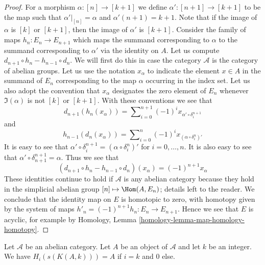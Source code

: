 \begin{proof}
For a morphism $\alpha : [n] \to [k + 1]$
we define $\alpha' : [n + 1] \to [k + 1]$ to be
the map such that $\alpha'|_{[n]} = \alpha$ and
$\alpha'(n + 1) = k + 1$. Note that if the
image of $\alpha$ is $[k]$ or $[k + 1]$, then
the image of $\alpha'$ is $[k + 1]$.
Consider the family of
maps $h_n : E_n \to E_{n + 1}$ which maps
the summand corresponding to $\alpha$ to
the summand corresponding to $\alpha'$ via
the identity on $A$.
Let us compute $d_{n + 1} \circ h_n - h_{n - 1} \circ d_n$.
We will first do this in case the category $\mathcal{A}$ is
the category of abelian groups.
Let us use the notation $x_\alpha$ to indicate
the element $x \in A$ in the summand of $E_n$ corresponding
to the map $\alpha$ occurring in the index set.
Let us also adopt the convention that
$x_\alpha$ designates the zero element of $E_n$
whenever $\Im(\alpha)$ is not $[k]$ or $[k + 1]$.
With these conventions we see that
$$
d_{n + 1}(h_n(x_\alpha)) =
\sum\nolimits_{i = 0}^{n + 1} (-1)^i x_{\alpha' \circ \delta^{n + 1}_i}
$$
and
$$
h_{n - 1}(d_n(x_\alpha)) =
\sum\nolimits_{i = 0}^n (-1)^i x_{(\alpha \circ \delta_i^n)'}
$$
It is easy to see that
$\alpha' \circ \delta^{n + 1}_i = (\alpha \circ \delta_i^n)'$
for $i = 0, \ldots, n$. It is also easy to see that
$\alpha' \circ \delta^{n + 1}_{n + 1} = \alpha$. Thus we
see that
$$
(d_{n + 1} \circ h_n - h_{n - 1} \circ d_n)(x_\alpha)
=
(-1)^{n + 1} x_\alpha
$$
These identities continue to hold if $\mathcal{A}$ is any abelian
category because they hold in the simplicial abelian group
$[n] \mapsto \Hom(A, E_n)$; details left to the reader.
We conclude that the identity map on $E$ is
homotopic to zero, with homotopy given by the
system of maps $h'_n = (-1)^{n + 1}h_n : E_n \to E_{n + 1}$.
Hence we see that $E$ is acyclic, for
example by Homology, Lemma \ref{homology-lemma-map-homology-homotopy}.
\end{proof}

\begin{lemma}
\label{lemma-homology-eilenberg-maclane}
Let $\mathcal{A}$ be an abelian category.
Let $A$ be an object of $\mathcal{A}$ and
let $k$ be an integer. We have
$H_i(s(K(A, k))) = A$ if $i = k$ and
$0$ else.
\end{lemma}

